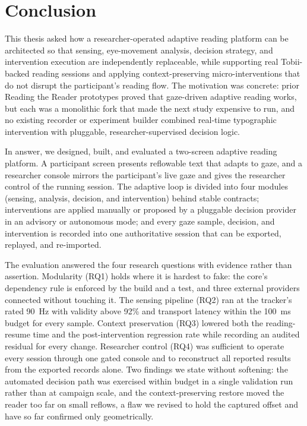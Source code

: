 \chapter{Conclusion}
\label{ch:conclusion}

This thesis asked how a researcher-operated adaptive reading platform can be architected so that sensing, eye-movement analysis, decision strategy, and intervention execution are independently replaceable, while supporting real Tobii-backed reading sessions and applying context-preserving micro-interventions that do not disrupt the participant's reading flow.
The motivation was concrete: prior Reading the Reader prototypes proved that gaze-driven adaptive reading works, but each was a monolithic fork that made the next study expensive to run, and no existing recorder or experiment builder combined real-time typographic intervention with pluggable, researcher-supervised decision logic.

In answer, we designed, built, and evaluated a two-screen adaptive reading platform.
A participant screen presents reflowable text that adapts to gaze, and a researcher console mirrors the participant's live gaze and gives the researcher control of the running session.
The adaptive loop is divided into four modules (sensing, analysis, decision, and intervention) behind stable contracts; interventions are applied manually or proposed by a pluggable decision provider in an advisory or autonomous mode; and every gaze sample, decision, and intervention is recorded into one authoritative session that can be exported, replayed, and re-imported.

The evaluation answered the four research questions with evidence rather than assertion.
Modularity (RQ1) holds where it is hardest to fake: the core's dependency rule is enforced by the build and a test, and three external providers connected without touching it.
The sensing pipeline (RQ2) ran at the tracker's rated \SI{90}{\hertz} with validity above 92\% and transport latency within the \SI{100}{\milli\second} budget for every sample.
Context preservation (RQ3) lowered both the reading-resume time and the post-intervention regression rate while recording an audited residual for every change.
Researcher control (RQ4) was sufficient to operate every session through one gated console and to reconstruct all reported results from the exported records alone.
Two findings we state without softening: the automated decision path was exercised within budget in a single validation run rather than at campaign scale, and the context-preserving restore moved the reader too far on small reflows, a flaw we revised to hold the captured offset and have so far confirmed only geometrically.

